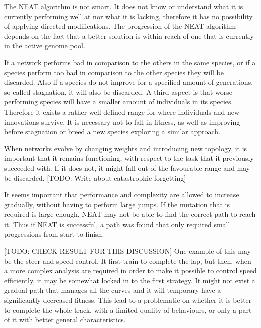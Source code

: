 The NEAT algorithm is not smart. It does not know or understand what it is currently performing well at nor what it is lacking, therefore it has no possibility of applying directed modifications. The progression of the NEAT algorithm depends on the fact that a better solution is within reach of one that is currently in the active genome pool.

If a network performs bad in comparison to the others in the same species, or if a species perform too bad in comparison to the other species they will be discarded\cite{stanley:neat}. Also if a species do not improve for a specified amount of generations, so called stagnation, it will also be discarded. A third aspect is that worse performing species will have a smaller amount of individuals in its species. Therefore it exists a rather well defined range for where individuals and new innovations survive. It is necessary not to fall in fitness, as well as improving before stagnation or breed a new species exploring a similar approach.

When networks evolve by changing weights and introducing new topology, it is important that it remains functioning, with respect to the task that it previously succeeded with. If it does not, it might fall out of the favourable range and may be discarded. [TODO: Write about catastrophic forgetting]

It seems important that performance and complexity are allowed to increase gradually, without having to perform large jumps. If the mutation that is required is large enough, NEAT may not be able to find the correct path to reach it. Thus if NEAT is successful, a path was found that only required small progressions from start to finish.

[TODO: CHECK RESULT FOR THIS DISCUSSION] One example of this may be the steer and speed control. It first train to complete the lap, but then, when a more complex analysis are required in order to make it possible to control speed efficiently, it may be somewhat locked in to the first strategy. It might not exist a gradual path that manages all the curves and it will temporary have a significantly decreased fitness. This lead to a problematic on whether it is better to complete the whole track, with a limited quality of behaviours, or only a part of it with better general characteristics.

